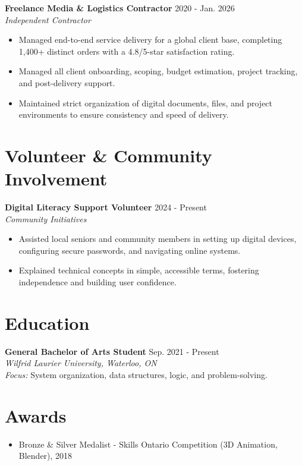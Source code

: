 \documentclass[a4paper,10pt]{article}
\begin{document}
\vspace{3pt}
\textbf{Freelance Media \& Logistics Contractor} \hfill 2020 - Jan. 2026 \\
\textit{Independent Contractor}
\begin{itemize}
    \item Managed end-to-end service delivery for a global client base, completing 1,400+ distinct orders with a 4.8/5-star satisfaction rating.
    \item Managed all client onboarding, scoping, budget estimation, project tracking, and post-delivery support.
    \item Maintained strict organization of digital documents, files, and project environments to ensure consistency and speed of delivery.
\end{itemize}

\section*{Volunteer \& Community Involvement}
\textbf{Digital Literacy Support Volunteer} \hfill 2024 - Present \\
\textit{Community Initiatives}
\begin{itemize}
    \item Assisted local seniors and community members in setting up digital devices, configuring secure passwords, and navigating online systems.
    \item Explained technical concepts in simple, accessible terms, fostering independence and building user confidence.
\end{itemize}

\section*{Education}
\textbf{General Bachelor of Arts Student} \hfill Sep. 2021 - Present \\
\textit{Wilfrid Laurier University, Waterloo, ON} \\
\textit{Focus:} System organization, data structures, logic, and problem-solving.

\section*{Awards}
\begin{itemize}
    \item Bronze \& Silver Medalist - Skills Ontario Competition (3D Animation, Blender), 2018
\end{itemize}
\end{document}
